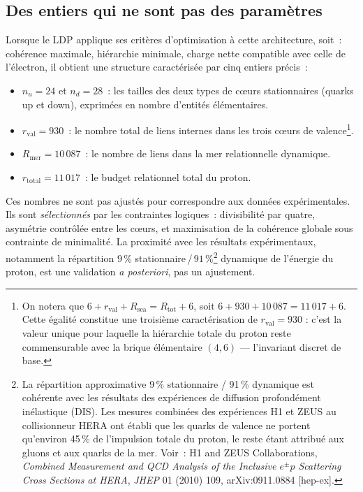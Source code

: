 \documentclass[12pt, a4paper, openright]{book}
\begin{document}
\subsection*{Des entiers qui ne sont pas des paramètres}

Lorsque le LDP applique ses critères d'optimisation à cette architecture, soit~: cohérence maximale, hiérarchie minimale, charge nette compatible avec celle de l'électron, il obtient une structure caractérisée par cinq entiers précis~:

\begin{itemize}
\item $n_u = 24$ et $n_d = 28$~: les tailles des deux types de c\oe{}urs stationnaires (quarks up et down), exprimées en nombre d'entités élémentaires.
\item $r_{\text{val}} = 930$~: le nombre total de liens internes dans les trois c\oe{}urs de valence\footnote{On notera que $6 + r_{\text{val}} + R_{\text{sea}} = R_{\text{tot}} + 6$, soit $6 + 930 + 10\,087 = 11\,017 + 6$. Cette égalité constitue une troisième caractérisation de $r_{\text{val}} = 930$ : c'est la valeur unique pour laquelle la hiérarchie totale du proton reste commensurable avec la brique élémentaire $(4,6)$ --- l'invariant discret de base.}.
\item $R_{\text{mer}} = 10\,087$~: le nombre de liens dans la mer relationnelle dynamique.
\item $r_{\text{total}} = 11\,017$~: le budget relationnel total du proton.
\end{itemize}

Ces nombres ne sont pas ajustés pour correspondre aux données expérimentales. Ils sont \emph{sélectionnés} par les contraintes logiques~: divisibilité par quatre, asymétrie contrôlée entre les c\oe{}urs, et maximisation de la cohérence globale sous contrainte de minimalité. La proximité avec les résultats expérimentaux, notamment la répartition $9\,\%$ stationnaire\,/\,$91\,\%$\footnote{La répartition approximative 9\,\% stationnaire / 91\,\% dynamique est cohérente avec les résultats des expériences de diffusion profondément inélastique (DIS). Les mesures combinées des expériences H1 et ZEUS au collisionneur HERA ont établi que les quarks de valence ne portent qu'environ 45\,\% de l'impulsion totale du proton, le reste étant attribué aux gluons et aux quarks de la mer. Voir~: H1 and ZEUS Collaborations, \textit{Combined Measurement and QCD Analysis of the Inclusive $e^{\pm}p$ Scattering Cross Sections at HERA}, \textit{JHEP} 01 (2010) 109, arXiv:0911.0884 [hep-ex].} dynamique de l'énergie du proton, est une validation \emph{a posteriori}, pas un ajustement.
\end{document}
